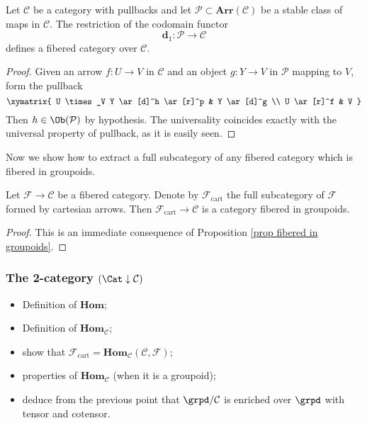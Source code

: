 \begin{prop} \label{prop stable arrows}
Let $\mathcal C$ be a category with pullbacks and let $\mathcal P \subset \mathbf{Arr}(\mathcal C)$ be a stable class of maps in $\mathcal C$. The restriction of the codomain functor
\[
\mathbf d_1 \colon \mathcal P \to \mathcal C
\]
defines a fibered category over $\mathcal C$.
\end{prop}

\begin{proof}
Given an arrow $f \colon U \to V$ in $\mathcal C$ and an object $g \colon Y \to V$ in $\mathcal P$ mapping to $V$, form the pullback
\[
\xymatrix{
U \times_V Y \ar[d]^h \ar[r]^p & Y \ar[d]^g \\ U \ar[r]^f & V
}
\]
Then $h \in \Ob(\mathcal P)$ by hypothesis. The universality coincides exactly with the universal property of pullback, as it is easily seen.
\end{proof}

Now we show how to extract a full subcategory of any fibered category which is fibered in groupoids.

\begin{prop} \label{prop extracting groupoids}
Let $\mathcal F \to \mathcal C$ be a fibered category. Denote by $\mathcal F_{\mathrm{cart}}$ the full subcategory of $\mathcal F$ formed by cartesian arrows. Then $\mathcal F_{\mathrm{cart}} \to \mathcal C$ is a category fibered in groupoids.
\end{prop}

\begin{proof}
This is an immediate consequence of Proposition \ref{prop fibered in groupoids}.
\end{proof}

\subsubsection{The 2-category $(\Cat \downarrow \mathcal C)$}

\begin{itemize}
\item Definition of $\mathbf{Hom}$;
\item Definition of $\mathbf{Hom}_{\mathcal C}$;
\item show that $\mathcal F_{\mathrm{cart}} = \mathbf{Hom}_{\mathcal C}( \mathcal C, \mathcal F)$;
\item properties of $\mathbf{Hom}_{\mathcal C}$ (when it is a groupoid);
\item deduce from the previous point that $\grpd / \mathcal C$ is enriched over $\grpd$ with tensor and cotensor.
\end{itemize}


